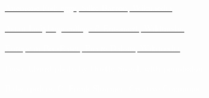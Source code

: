\documentclass[t]{beamer}
\begin{document}
%

{
\begin{frame}
\end{frame}
}

{
\begin{frame}
\end{frame}
}

{
\begin{frame}
\tinyfill \href{https://en.m.wikipedia.org/wiki/File:Anemone_Fish_Eggs.jpg}{\textcolor{white}{Anemone Fish eggs, Silke Barron, Wikimedia, }}
\end{frame}
}

%

{
\begin{frame}
\tinyfill \href{https://upload.wikimedia.org/wikipedia/commons/thumb/7/7d/Harmonia_axyridis01.jpg/974px-Harmonia_axyridis01.jpg}{\textcolor{white}{Asian Ladybugs collage © Entomart, Wikimedia, \ccbync{}}}
\end{frame}
}

%

{
\begin{frame}
\tinyfill \href{https://en.wikipedia.org/wiki/European_bee-eater\#/media/File:Merops_apiaster_04.jpg}{\textcolor{white}{European Bee-Eater, Pierre Dalous, Wikimedia, }}
\end{frame}
}

%

{
\begin{frame}
\tinyfill \textcolor{white}{Fence Lizard photo by Dustin Siegel, with permission.}
\end{frame}
}

%

{
\begin{frame}
\tinyfill \textcolor{white}{Baby spiders, C. Frank Sharmer, Creative Commons.}
\end{frame}
}

%
\end{document}
